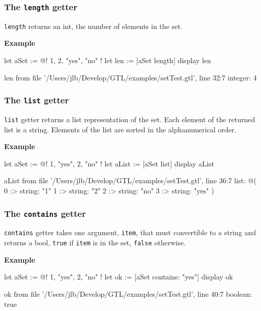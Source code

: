 \documentclass[10pt,openright,twosides]{report}
\newcommand{\gtltype}[1]{{\small\ttfamily #1}}
\newcommand{\gtlinline}[1]{\colorbox{light-blue}{\lstinline[language=gtl]{#1}}}
\newcommand{\example}{\vspace{.75em}\noindent\textbf{Example}\vspace{0em}}
\begin{document}
\subsubsection{The \texttt{length} getter}

\gtlinline{length} returns an \gtltype{int}, the number of elements in the set.

\example
\begin{gtl}
let aSet := @! 1, 2, "yes", "no" !
let len := [aSet length]
display len
\end{gtl}
\begin{console}
len from file '/Users/jlb/Develop/GTL/examples/setTest.gtl', line 32:7
    integer: 4
\end{console}

\subsubsection{The \texttt{list} getter}

\gtlinline{list} getter returns a list representation of the set. Each element of the returned list is a string. Elements of the list are sorted in the alphanumerical order.

\example
\begin{gtl}
let aSet := @! 1, "yes", 2, "no" !
let aList := [aSet list]
display aList
\end{gtl}
\begin{console}
aList from file '/Users/jlb/Develop/GTL/examples/setTest.gtl', line 36:7
    list: @(
        0 :>
            string: "1"
        1 :>
            string: "2"
        2 :>
            string: "no"
        3 :>
            string: "yes"
    )
\end{console}

\subsubsection{The \texttt{contains} getter}

\gtlinline{contains} getter takes one argument, \gtlinline{item}, that must convertible to a string and returns a bool, \gtlinline{true} if \gtlinline{item} is in the set, \gtlinline{false} otherwise.

\example
\begin{gtl}
let aSet := @! 1, "yes", 2, "no" !
let ok := [aSet contains: "yes"]
display ok
\end{gtl}
\begin{console}
ok from file '/Users/jlb/Develop/GTL/examples/setTest.gtl', line 40:7
    boolean: true
\end{console}
\end{document}
